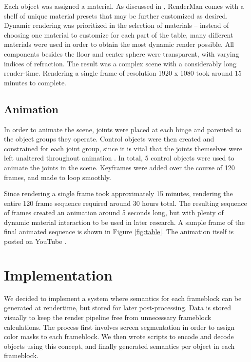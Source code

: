 \documentclass[conference]{IEEEtran}
\begin{document}
Each object was assigned a material.
As discussed in \cite{renderman},
RenderMan comes with a shelf of unique material presets that may be further customized as desired.
Dynamic rendering was prioritized in the selection of materials --
instead of choosing one material to customize for each part of the table,
many different materials were used in order to obtain the most dynamic render possible.
All components besides the floor and center sphere were transparent, with varying indices of refraction.
The result was a complex scene with a considerably long render-time.
Rendering a single frame of resolution 1920 x 1080 took around 15 minutes to complete.

\subsection{Animation}
In order to animate the scene, joints were placed at each hinge and parented to the object groups they operate.
Control objects were then created and constrained for each joint group,
since it is vital that the joints themselves were left unaltered throughout animation \cite{rigging}.
In total, 5 control objects were used to animate the joints in the scene.
Keyframes were added over the course of 120 frames, and made to loop smoothly.

Since rendering a single frame took approximately 15 minutes,
rendering the entire 120 frame sequence required around 30 hours total.
The resulting sequence of frames created an animation around 5 seconds long,
but with plenty of dynamic material interaction to be used in later research.
A sample frame of the final animated sequence is shown in Figure \ref{fig:table}.
The animation itself is posted on YouTube \cite{animation}.

\section{Implementation}
\label{sec:implementation}
We decided to implement a system where semantics for each frameblock
can be generated at rendertime, but stored for later post-processing.
Data is stored visually to keep the render pipeline free from
unnecessary frameblock calculations.
The process first involves screen segmentation in order to assign color
masks to each frameblock. We then wrote scripts to encode and decode
objects using this concept, and finally generated semantics per object
in each frameblock.
\end{document}

